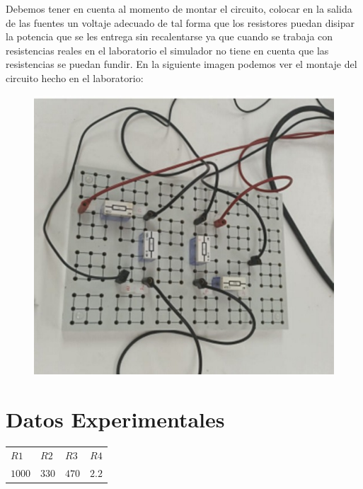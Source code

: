 \documentclass[letterpaper, 12pt]{article}
\begin{document}
Debemos tener en cuenta al momento de montar el circuito,
colocar en la salida de las fuentes un voltaje adecuado de
tal forma que los resistores puedan disipar la potencia que
se les entrega sin recalentarse ya que cuando se trabaja
con resistencias reales en el laboratorio el simulador no
tiene en cuenta que las resistencias se puedan fundir. En
la siguiente imagen podemos ver el montaje del circuito
hecho en el laboratorio:

\begin{figure}[H]
	\centering
	\includegraphics[scale = .5]{./Images/Imagen2.jpeg}
\end{figure}

\section{Datos Experimentales}

\begin{tabularx}{0.9\linewidth}{|>{\centering\arraybackslash}X|>{\centering\arraybackslash}X|>{\centering\arraybackslash}X|>{\centering\arraybackslash}X|}
	\multicolumn{4}{c}{Valor de resistencias $(\Omega)$} \\ \hline

	$R1$   & $R2$  & $R3$  & $R4$                        \\ \hline
	$1000$ & $330$ & $470$ & $2.2$                       \\ \hline
\end{tabularx}
\end{document}
